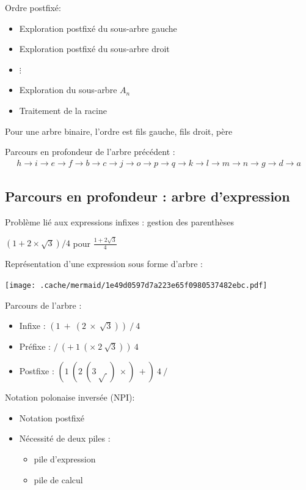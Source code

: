 Ordre postfixé:

\begin{itemize}
\tightlist
\item
  Exploration postfixé du sous-arbre gauche
\item
  Exploration postfixé du sous-arbre droit
\item
  \(\vdots\)
\item
  Exploration du sous-arbre \(A_n\)
\item
  Traitement de la racine
\end{itemize}

Pour une arbre binaire, l'ordre est fils gauche, fils droit, père

Parcours en profondeur de l'arbre précédent : \begin{align*}
    h \to i \to e \to f \to b \to c \to j \to o \to p \to q \to k \to l \to m \to n \to g \to d \to a
\end{align*}

\hypertarget{parcours-en-profondeur-arbre-dexpression}{%
\subsection{Parcours en profondeur : arbre
d'expression}\label{parcours-en-profondeur-arbre-dexpression}}

Problème lié aux expressions infixes : gestion des parenthèses

\(\left(1 + 2 \times \sqrt3\right) / 4\) pour \(\frac{1 + 2\sqrt3}4\)

Représentation d'une expression sous forme d'arbre :

\texttt{[image: .cache/mermaid/1e49d0597d7a223e65f0980537482ebc.pdf]}

Parcours de l'arbre :

\begin{itemize}
\tightlist
\item
  Infixe : \((1~+~(2~\times~\sqrt{3}))~/~4\)
\item
  Préfixe : \(/~(+~1~(\times~2~\sqrt3))~4\)
\item
  Postfixe : \((1~(2~(3~\sqrt{~})~\times)~+)~4~/\)
\end{itemize}

Notation polonaise inversée (NPI):

\begin{itemize}
\tightlist
\item
  Notation postfixé
\item
  Nécessité de deux piles :

  \begin{itemize}
  \tightlist
  \item
    pile d'expression
  \item
    pile de calcul
  \end{itemize}
\end{itemize}

